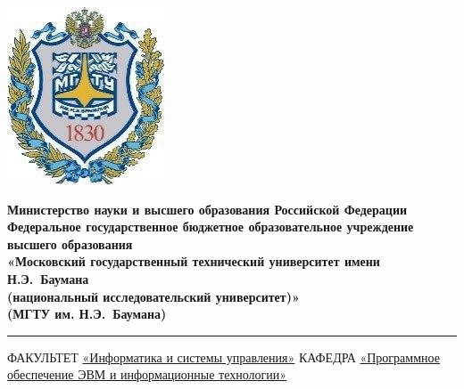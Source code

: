 \documentclass[12pt]{report}
\begin{document}
	
	\begin{titlepage}
		\fontsize{12pt}{12pt}\selectfont
		\noindent \begin{minipage}{0.15\textwidth}
			\includegraphics[width=\linewidth]{baum.jpg}
		\end{minipage}
		\noindent\begin{minipage}{0.9\textwidth}\centering
			\textbf{Министерство науки и высшего образования Российской Федерации}\\
			\textbf{Федеральное государственное бюджетное образовательное учреждение высшего образования}\\
			\textbf{«Московский государственный технический университет имени Н.Э.~Баумана}\\
			\textbf{(национальный исследовательский университет)»}\\
			\textbf{(МГТУ им. Н.Э.~Баумана)}
		\end{minipage}
		
		\noindent\rule{18cm}{3pt}
		\newline\newline
		\noindent ФАКУЛЬТЕТ \underline{«Информатика и системы управления»} 
		\newline\newline
		\noindent КАФЕДРА \underline{«Программное обеспечение ЭВМ и информационные технологии»}
		\newline\newline\newline\newline\newline\newline\newline
		

\end{titlepage}
\end{document}
